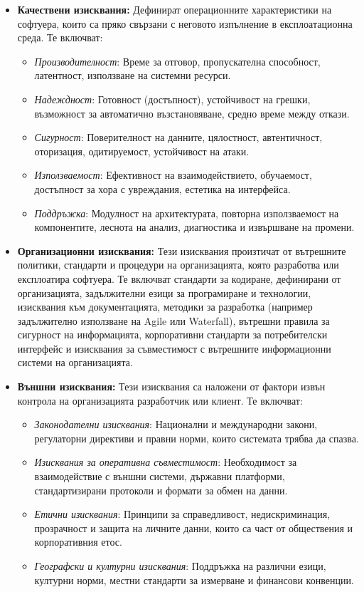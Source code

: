 \documentclass{scrartcl}
\begin{document}
\begin{FlushLeft}
\begin{itemize}
    \begin{itemize}
        \item \textbf{Качествени изисквания:} Дефинират операционните характеристики на софтуера, които са пряко свързани с неговото изпълнение в експлоатационна среда. Те включват:
        \begin{itemize}
            \item \textit{Производителност}: Време за отговор, пропускателна способност, латентност, използване на системни ресурси.
            \item \textit{Надеждност}: Готовност (достъпност), устойчивост на грешки, възможност за автоматично възстановяване, средно време между откази.
            \item \textit{Сигурност}: Поверителност на данните, цялостност, автентичност, оторизация, одитируемост, устойчивост на атаки.
            \item \textit{Използваемост}: Ефективност на взаимодействието, обучаемост, достъпност за хора с увреждания, естетика на интерфейса.
            \item \textit{Поддръжка}: Модулност на архитектурата, повторна използваемост на компонентите, леснота на анализ, диагностика и извършване на промени.
        \end{itemize}
        
        \item \textbf{Организационни изисквания:} Тези изисквания произтичат от вътрешните политики, стандарти и процедури на организацията, която разработва или експлоатира софтуера. Те включват стандарти за кодиране, дефинирани от организацията, задължителни езици за програмиране и технологии, изисквания към документацията, методики за разработка (например задължително използване на Agile или Waterfall), вътрешни правила за сигурност на информацията, корпоративни стандарти за потребителски интерфейс и изисквания за съвместимост с вътрешните информационни системи на организацията.
        
        \item \textbf{Външни изисквания:} Тези изисквания са наложени от фактори извън контрола на организацията разработчик или клиент. Те включват:
        \begin{itemize}
            \item \textit{Законодателни изисквания}: Национални и международни закони, регулаторни директиви и правни норми, които системата трябва да спазва.
            \item \textit{Изисквания за оперативна съвместимост}: Необходимост за взаимодействие с външни системи, държавни платформи, стандартизирани протоколи и формати за обмен на данни.
            \item \textit{Етични изисквания}: Принципи за справедливост, недискриминация, прозрачност и защита на личните данни, които са част от обществения и корпоративния етос.
            \item \textit{Географски и културни изисквания}: Поддръжка на различни езици, културни норми, местни стандарти за измерване и финансови конвенции.
        \end{itemize}
    \end{itemize}
    

\end{itemize}
\end{FlushLeft}
\end{document}

